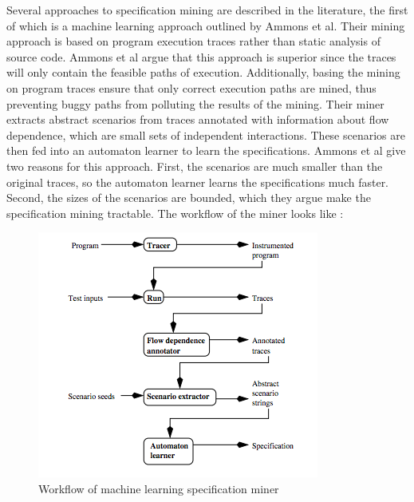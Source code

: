 \documentclass[12pt]{article}
\begin{document}
\noindent Several approaches to specification mining are described in the
literature, the first of which is a machine learning approach outlined by
Ammons et al. Their mining approach is based on program execution traces rather
than static analysis of source code. Ammons et al argue that this approach is
superior since the traces will only contain the feasible paths of execution.
Additionally, basing the mining on program traces ensure that only correct
execution paths are mined, thus preventing buggy paths from polluting the
results of the mining\cite{Ammons:2002:MS:503272.503275}. Their miner extracts
abstract scenarios from traces annotated with information about flow
dependence, which are small sets of independent interactions. These scenarios
are then fed into an automaton learner to learn the specifications. Ammons et
al give two reasons for this approach. First, the scenarios are much smaller
than the original traces, so the automaton learner learns the specifications
much faster. Second, the sizes of the scenarios are bounded, which they argue
make the specification mining tractable. The workflow of the miner looks like
\cite{Ammons:2002:MS:503272.503275}:\\
\begin{figure}[ht]
\centerline{
\includegraphics[width=\linewidth]{machine_learning_miner_workflow.png}
}
\caption{\label{machine_learning_miner_workflow}
    Workflow of machine learning specification miner
}
\end{figure}
\\
\end{document}
